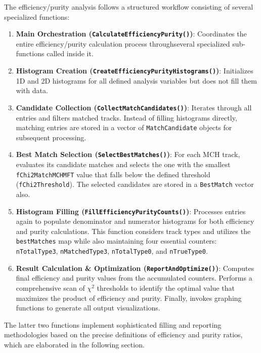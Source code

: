 \documentclass{article}
\begin{document}
The efficiency/purity analysis follows a structured workflow consisting of several specialized functions:

\begin{enumerate}
    \item \textbf{Main Orchestration (\texttt{CalculateEfficiencyPurity()})}: Coordinates the entire efficiency/purity calculation process throughseveral specialized sub-functions called inside it.
    
    \item \textbf{Histogram Creation (\texttt{CreateEfficiencyPurityHistograms()})}: Initializes 1D and 2D histograms for all defined analysis variables but does not fill them with data.
    
    \item \textbf{Candidate Collection (\texttt{CollectMatchCandidates()})}: Iterates through all entries and filters matched tracks. Instead of filling histograms directly, matching entries are stored in a vector of \texttt{MatchCandidate} objects for subsequent processing.
    
    \item \textbf{Best Match Selection (\texttt{SelectBestMatches()})}: For each MCH track, evaluates its candidate matches and selects the one with the smallest \texttt{fChi2MatchMCHMFT} value that falls below the defined threshold (\texttt{fChi2Threshold}). The selected candidates are stored in a \texttt{BestMatch} vector also.
    
    \item \textbf{Histogram Filling (\texttt{FillEfficiencyPurityCounts()})}: Processes entries again to populate denominator and numerator histograms for both efficiency and purity calculations. This function considers track types and utilizes the \texttt{bestMatches} map while also maintaining four essential counters: \texttt{nTotalType3}, \texttt{nMatchedType3}, \texttt{nTotalType0}, and \texttt{nTrueType0}.
    
    \item \textbf{Result Calculation \& Optimization (\texttt{ReportAndOptimize()})}: Computes final efficiency and purity values from the accumulated counters. Performs a comprehensive scan of $\chi^2$ thresholds to identify the optimal value that maximizes the product of efficiency and purity. Finally, invokes graphing functions to generate all output visualizations.
\end{enumerate}

The latter two functions implement sophisticated filling and reporting methodologies based on the precise definitions of efficiency and purity ratios, which are elaborated in the following section.
\end{document}
